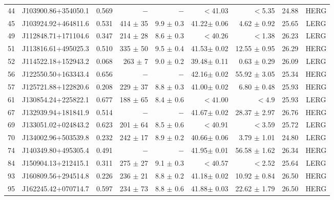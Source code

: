 \documentclass[twocolumn]{aastex62}
\begin{document}
\begin{table*}
\begin{minipage}{180mm}
{\begin{tabular}{@{} r c r r r r r c  c @{}}
44& J103900.86+354050.1 &    0.569&     $-$	    &        $-$           & $<$41.03                &  $<$5.35               &24.88&  HERG\\
45& J103924.92+464811.6 &    0.531& 414 $\pm$  35&       9.9 $\pm$     0.3 &    41.22$\pm$      0.06 &     4.62 $\pm$     0.92&25.65&  LERG\\
49& J112848.71+171104.6 &    0.347& 214 $\pm$  28&       8.6 $\pm$     0.3 & $<$40.26                &  $<$1.38               &26.23&  LERG\\
51& J113816.61+495025.3 &    0.510& 335 $\pm$  50&       9.5 $\pm$     0.4 &    41.53$\pm$      0.02 &    12.55 $\pm$     0.95&26.29&  HERG\\
52& J114522.18+152943.2 &    0.068& 263 $\pm$   7&       9.0 $\pm$     0.2 &    39.48$\pm$      0.11 &     0.63 $\pm$     0.29&26.09&  LERG\\
56& J122550.50+163343.4 &    0.656&     $-$	    &        $-$           &    42.16$\pm$      0.02 &    55.92 $\pm$     3.05&25.34&  HERG\\
57& J125721.88+122820.6 &    0.208& 229 $\pm$  37&       8.8 $\pm$     0.3 &    41.00$\pm$      0.02 &     6.80 $\pm$     0.48&25.93&  HERG\\
61& J130854.24+225822.1 &    0.677& 188 $\pm$  65&       8.4 $\pm$     0.6 & $<41.00$                &  $<4.9$                &25.93&  LERG\\
67& J132939.94+181841.9 &    0.514&     $-$	    &        $-$           &    41.67$\pm$      0.02 &    28.37 $\pm$     2.97&26.76&  HERG\\
69& J133051.02+024843.2 &    0.623& 201 $\pm$  64&       8.5 $\pm$     0.6 & $<$40.91                &  $<$3.59               &25.72&  LERG\\
70& J134002.96+503539.8 &    0.232& 242 $\pm$  17&       8.9 $\pm$     0.2 &    40.66$\pm$      0.06 &     3.79 $\pm$     1.01&24.80&  LERG\\
74& J140349.80+495305.4 &    0.491&     $-$	    &        $-$           &    41.95$\pm$      0.01 &    56.58 $\pm$     1.62&26.34&  HERG\\
84& J150904.13+212415.1 &    0.311& 275 $\pm$  27&       9.1 $\pm$     0.3 &    $<40.57$             &  $<$2.52               &25.64&  LERG\\
93& J160809.56+294514.8 &    0.226& 236 $\pm$  21&       8.8 $\pm$     0.2 &    41.18$\pm$      0.02 &    10.92 $\pm$     0.84&26.50&  HERG\\
95& J162245.42+070714.7 &    0.597& 234 $\pm$  73&       8.8 $\pm$     0.6 &    41.88$\pm$      0.03 &    22.62 $\pm$     1.79&26.50&  HERG\\

\end{tabular}}
\end{minipage}
\end{table*}
\end{document}
